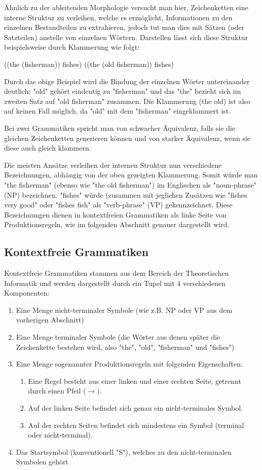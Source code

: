 \documentclass[12pt]{report}
\begin{document}
Ähnlich zu der ableitenden Morphologie versucht man hier, Zeichenketten eine interne Struktur zu verleihen, welche es ermöglicht, Informationen zu den einzelnen Bestandteilen zu extrahieren, jedoch tut man dies mit Sätzen (oder Satzteilen) anstelle von einzelnen Wörtern. Darstellen lässt sich diese Struktur beispielsweise durch Klammerung wie folgt:

((the (fisherman)) fishes)
((the (old fisherman)) fishes)

Durch das obige Beispiel wird die Bindung der einzelnen Wörter untereinander deutlich: "old" gehört eindeutig zu "fisherman" und das "the" bezieht sich im zweiten Satz auf "old fisherman" zusammen. Die Klammerung (the old) ist also auf keinen Fall möglich, da "old" mit dem "fisherman" eingeklammert ist. 

Bei zwei Grammatiken spricht man von schwacher Äquivalenz, falls sie die gleichen Zeichenketten generieren können und von starker Äquivalenz, wenn sie diese auch gleich klammern. 

Die meisten Ansätze verleihen der internen Struktur nun verschiedene Bezeichnungen, abhängig von der oben gezeigten Klammerung. Somit würde man "the fisherman" (ebenso wie "the old fisherman") im Englischen als "noun-phrase" (NP) bezeichnen. "fishes" würde (zusammen mit jeglichen Zusätzen wie "fishes very good" oder "fishes fish" als "verb-phrase" (VP) gekennzeichnet. Diese Bezeichnungen dienen in kontextfreien Grammatiken als linke Seite von Produktionsregeln, wie im folgenden Abschnitt genauer dargestellt wird.

\subsection{Kontextfreie Grammatiken}
Kontextfreie Grammatiken stammen aus dem Bereich der Theoretischen Informatik und werden dargestellt durch ein Tupel mit 4 verschiedenen Komponenten:

\begin{enumerate}
\item Eine Menge nicht-terminaler Symbole (wie z.B. NP oder VP aus dem vorherigen Abschnitt)
\item Eine Menge terminaler Symbole (die Wörter aus denen später die Zeichenkette bestehen wird, also "the", "old", "fisherman" und "fishes")
\item Eine Menge sogenannter Produktionsregeln mit folgenden Eigenschaften:
\begin{enumerate}
\item Eine Regel besteht aus einer linken und einer rechten Seite, getrennt durch einen Pfeil ($\rightarrow$).
\item Auf der linken Seite befindet sich genau ein nicht-terminales Symbol.
\item Auf der rechten Seiten befindet sich mindestens ein Symbol (terminal oder nicht-terminal).
\end{enumerate}
\item Das Startsymbol (konventionell "S"), welches zu den nicht-terminalen Symbolen gehört
\end{enumerate}
\end{document}
